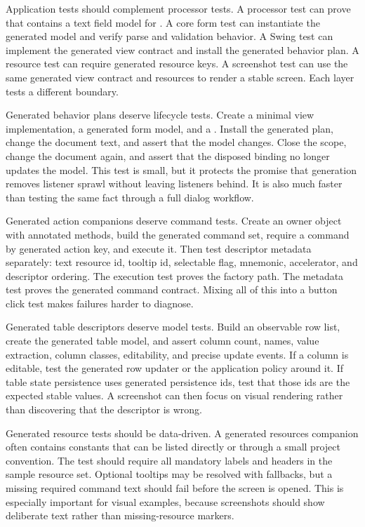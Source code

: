 Application tests should complement processor tests. A processor test can
prove that  contains a text field model for
. A core form test can instantiate the generated model and verify
parse and validation behavior. A Swing test can implement the generated view
contract and install the generated behavior plan. A resource test can require
generated resource keys. A screenshot test can use the same generated view
contract and resources to render a stable screen. Each layer tests a different
boundary.

Generated behavior plans deserve lifecycle tests. Create a minimal view
implementation, a generated form model, and a . Install the
generated plan, change the document text, and assert that the model changes.
Close the scope, change the document again, and assert that the disposed
binding no longer updates the model. This test is small, but it protects the
promise that generation removes listener sprawl without leaving listeners
behind. It is also much faster than testing the same fact through a full
dialog workflow.

Generated action companions deserve command tests. Create an owner object with
annotated methods, build the generated command set, require a command by
generated action key, and execute it. Then test descriptor metadata separately:
text resource id, tooltip id, selectable flag, mnemonic, accelerator, and
descriptor ordering. The execution test proves the factory path. The metadata
test proves the generated command contract. Mixing all of this into a button
click test makes failures harder to diagnose.

Generated table descriptors deserve model tests. Build an observable row list,
create the generated table model, and assert column count, names, value
extraction, column classes, editability, and precise update events. If a column
is editable, test the generated row updater or the application policy around
it. If table state persistence uses generated persistence ids, test that those
ids are the expected stable values. A screenshot can then focus on visual
rendering rather than discovering that the descriptor is wrong.

Generated resource tests should be data-driven. A generated resources
companion often contains constants that can be listed directly or through a
small project convention. The test should require all mandatory labels and
headers in the sample resource set. Optional tooltips may be resolved with
fallbacks, but a missing required command text should fail before the screen is
opened. This is especially important for visual examples, because screenshots
should show deliberate text rather than missing-resource markers.

